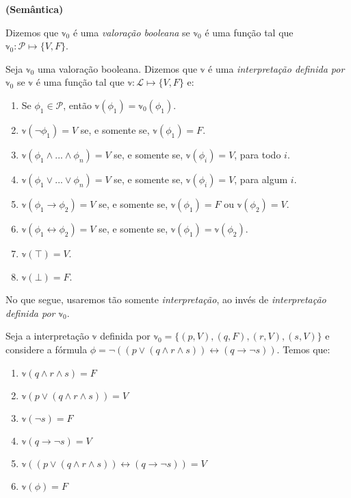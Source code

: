 \begin{definition}\textbf{(Semântica)}
	
	Dizemos que $\mathbb{v}_0$ é uma \emph{valoração booleana} se $\mathbb{v}_0$ é uma função tal que\break $\mathbb{v}_0 : \mathcal{P} \longmapsto \{V,F\}$.
    
    Seja $\mathbb{v}_0$ uma valoração booleana. Dizemos que $\mathbb{v}$ é uma \emph{interpretação definida por $\mathbb{v}_0$} se $\mathbb{v}$ é uma função tal que $\mathbb{v} : \mathcal{L} \longmapsto \{V,F\}$ e:
    \begin{enumerate}
        \item Se $\phi_1 \in \mathcal{P}$, então $\mathbb{v}(\phi_1) = \mathbb{v}_0(\phi_1)$.
        \item $\mathbb{v}(\neg \phi_1) = V$ se, e somente se, $\mathbb{v}(\phi_1) = F$.
        \item $\mathbb{v}(\phi_1 \wedge ... \wedge \phi_n) = V$ se, e somente se, $\mathbb{v}(\phi_i) = V$, para todo $i$.
        \item $\mathbb{v}(\phi_1 \vee ... \vee \phi_n) = V$ se, e somente se, $\mathbb{v}(\phi_i) = V$, para algum $i$.
        \item $\mathbb{v}(\phi_1 \rightarrow \phi_2) = V$ se, e somente se, $\mathbb{v}(\phi_1) = F$ ou $\mathbb{v}(\phi_2) = V$.
        \item $\mathbb{v}(\phi_1 \leftrightarrow \phi_2) = V$ se, e somente se, $\mathbb{v}(\phi_1) = \mathbb{v}(\phi_2)$.
        \item $\mathbb{v}(\top) = V$.
        \item $\mathbb{v}(\bot) = F$.
    \end{enumerate}
\end{definition}

No que segue, usaremos tão somente \emph{interpretação}, ao invés de \emph{interpretação definida por $\mathbb{v}_0$}.

\begin{example}
    Seja a interpretação $\mathbb{v}$ definida por $\mathbb{v}_0 = \{(p,V),(q,F),(r,V),(s,V)\}$ e considere a fórmula $\phi = \neg((p \vee (q \wedge r \wedge s)) \leftrightarrow (q \rightarrow \neg s))$. Temos que:
    \begin{enumerate}
        \item $\mathbb{v}(q \wedge r \wedge s) = F$
        \item $\mathbb{v}(p \vee (q \wedge r \wedge s)) = V$
        \item $\mathbb{v}(\neg s) = F$
        \item $\mathbb{v}(q \rightarrow \neg s) = V$
        \item $\mathbb{v}((p \vee (q \wedge r \wedge s)) \leftrightarrow (q \rightarrow \neg s)) = V$
        \item $\mathbb{v}(\phi) = F$
    \end{enumerate}
\end{example}

